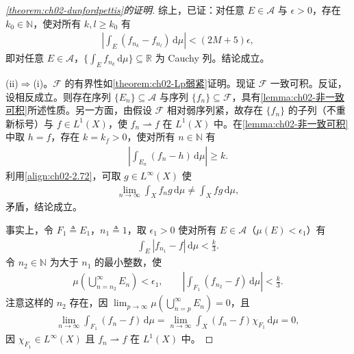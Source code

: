 \documentclass[../../main.tex]{subfiles}%
\begin{document}
\begin{proof}[\cref{theorem:ch02-dunfordpettis}的证明]
综上，已证：对任意 $E\in\mathscr A$ 与 $\epsilon>0$，存在 $k_0\in\mathbb N$，使对所有 $k,l\geqslant k_0$ 有
\begin{align*}
\left|\int_E(f_{n_k}-f_{n_l})\,\mathrm{d}\mu\right|<(2M+5)\epsilon,
\end{align*}
即对任意 $E\in\mathscr A$，$\{\int_E f_{n_k}\,\mathrm{d}\mu\}\subseteq\mathbb R$ 为 Cauchy 列。结论成立。

(ii)$\Rightarrow$(i)。$\mathscr F$ 的有界性如\cref{theorem:ch02-Lp弱紧}证明。现证 $\mathscr F$ 一致可积。反证，设相反成立。则存在序列 $\{E_n\}\subseteq\mathscr A$ 与序列 $\{f_n\}\subseteq\mathscr F$，具有\cref{lemma:ch02-非一致可积}所述性质。另一方面，由假设 $\mathscr F$ 相对弱序列紧，故存在 $\{f_n\}$ 的子列（不重新标号）与 $f\in L^1(X)$，使 $f_n\rightharpoonup f$ 在 $L^1(X)$ 中。在\cref{lemma:ch02-非一致可积}中取 $h=f$，存在 $k=k_f>0$，使对所有 $n\in\mathbb N$ 有
\begin{align}
\left|\int_{E_n}(f_n-h)\,\mathrm{d}\mu\right|\geqslant k. \label{align:ch02-2.72}
\end{align}
利用\eqref{align:ch02-2.72}，可取 $g\in L^\infty(X)$ 使
\begin{align}
\lim_{n\to\infty}\int_X f_ng\,\mathrm{d}\mu\neq\int_X fg\,\mathrm{d}\mu, \label{align:ch02-2.73}
\end{align}
矛盾，结论成立。

事实上，令 $F_1\triangleq E_1$，$n_1\triangleq 1$，取 $\epsilon_1>0$ 使对所有 $E\in\mathscr A$（$\mu(E)<\epsilon_1$）有
\begin{align*}
\int_E|f_{n_1}-f|\,\mathrm{d}\mu<\frac k3.
\end{align*}
令 $n_2\in\mathbb N$ 为大于 $n_1$ 的最小整数，使
\begin{align*}
\mu\left(\bigcup_{n=n_2}^\infty E_n\right)<\epsilon_1,\qquad
\left|\int_{F_1}(f_{n_2}-f)\,\mathrm{d}\mu\right|<\frac k3.
\end{align*}
注意这样的 $n_2$ 存在，因 $\lim_{p\to\infty}\mu(\bigcup_{n=p}^\infty E_n)=0$，且
\begin{align*}
\lim_{n\to\infty}\int_{F_1}(f_n-f)\,\mathrm{d}\mu=\lim_{n\to\infty}\int_X(f_n-f)\chi_{F_1}\,\mathrm{d}\mu=0,
\end{align*}
因 $\chi_{F_1}\in L^\infty(X)$ 且 $f_n\rightharpoonup f$ 在 $L^1(X)$ 中。


\end{proof}
\end{document}
